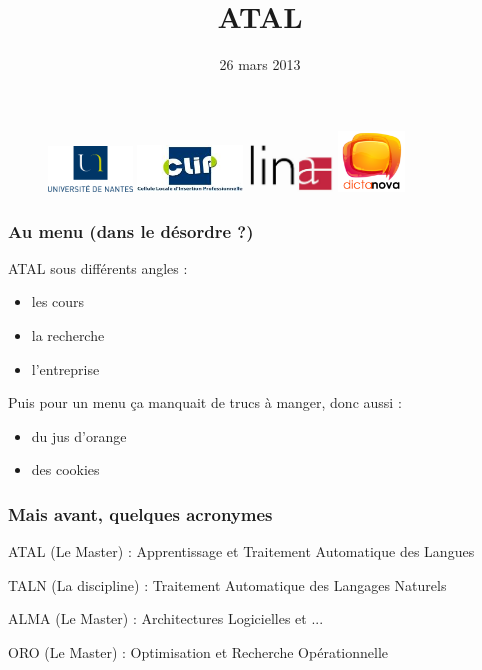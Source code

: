 \documentclass{beamer}
\title{ATAL}
\institute{ASCII}
\date{26 mars 2013}
\begin{document}
\begin{frame}
  \maketitle
  \begin{figure}
    \includegraphics[width=0.20\textwidth]{logo_univ_nantes}
    \hfill
    \includegraphics[width=0.25\textwidth]{logo_clip}
    \hfill
    \includegraphics[width=0.20\textwidth]{logo_lina}
    \hfill
    \includegraphics[width=0.16\textwidth]{dictanova_logo}
  \end{figure}
\end{frame}

\begin{frame}
  \frametitle{Au menu (dans le désordre ?)}
  ATAL sous différents angles :
  \begin{itemize}
  \item les cours
  \item la recherche
  \item l'entreprise
  \end{itemize}
  
  Puis pour un menu ça manquait de trucs à manger, donc aussi :
  \begin{itemize}
  \item du jus d'orange
  \item des cookies
  \end{itemize}
\end{frame}

\begin{frame}
  \frametitle{Mais avant, quelques acronymes}
  ATAL (Le Master) : Apprentissage et Traitement Automatique des
  Langues 

  TALN (La discipline) : Traitement Automatique des Langages Naturels

  ALMA (Le Master) : Architectures Logicielles et ...

  ORO (Le Master) : Optimisation et Recherche Opérationnelle
\end{frame}
\end{document}
